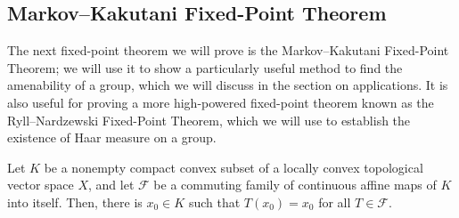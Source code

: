 \documentclass[10pt]{mypackage}
\begin{document}
\subsection{Markov--Kakutani Fixed-Point Theorem}%
The next fixed-point theorem we will prove is the Markov--Kakutani Fixed-Point Theorem; we will use it to show a particularly useful method to find the amenability of a group, which we will discuss in the section on applications. It is also useful for proving a more high-powered fixed-point theorem known as the Ryll--Nardzewski Fixed-Point Theorem, which we will use to establish the existence of Haar measure on a group.
\begin{theorem}
  Let $K$ be a nonempty compact convex subset of a locally convex topological vector space $X$, and let $ \mathcal{F} $ be a commuting family of continuous affine maps of $K$ into itself. Then, there is $x_0\in K$ such that $T\left( x_0 \right) = x_0$ for all $T\in \mathcal{F}$.
\end{theorem}
\end{document}
